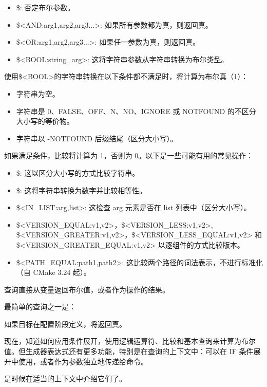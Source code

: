 \begin{itemize}
\item
\$<NOT:arg>: 否定布尔参数。

\item
\$<AND:arg1,arg2,arg3...>: 如果所有参数都为真，则返回真。

\item
\$<OR:arg1,arg2,arg3...>: 如果任一参数为真，则返回真。

\item
\$<BOOL:string\_arg>: 这将字符串参数从字符串转换为布尔类型。
\end{itemize}

使用\$<BOOL>的字符串转换在以下条件都不满足时，将计算为布尔真（1）：

\begin{itemize}
\item
字符串为空。

\item
字符串是 0、FALSE、OFF、N、NO、IGNORE 或 NOTFOUND 的不区分大小写的等价物。

\item
字符串以 -NOTFOUND 后缀结尾（区分大小写）。
\end{itemize}


如果满足条件，比较将计算为 1，否则为 0。以下是一些可能有用的常见操作：

\begin{itemize}
\item
\$<STREQUAL:arg1,arg2>: 这以区分大小写的方式比较字符串。

\item
\$<EQUAL:arg1,arg2>: 这将字符串转换为数字并比较相等性。

\item
\$<IN\_LIST:arg,list>: 这检查 arg 元素是否在 list 列表中（区分大小写）。

\item
\$<VERSION\_EQUAL:v1,v2>，\$<VERSION\_LESS:v1,v2>, \$<VERSION\_GREATER:v1,v2>，\$<VERSION\_LESS\_EQUAL:v1,v2> 和 \$<VERSION\_GREATER\_EQUAL:v1,v2> 以逐组件的方式比较版本。

\item
\$<PATH\_EQUAL:path1,path2>: 这比较两个路径的词法表示，不进行标准化（自 CMake 3.24 起）。
\end{itemize}


查询直接从变量返回布尔值，或者作为操作的结果。

最简单的查询之一是：


如果目标在配置阶段定义，将返回真。

现在，知道如何应用条件展开，使用逻辑运算符、比较和基本查询来计算为布尔值。但生成器表达式还有更多功能，特别是在查询的上下文中：可以在 IF 条件展开中使用，或者作为参数独立地传递给命令。

是时候在适当的上下文中介绍它们了。



